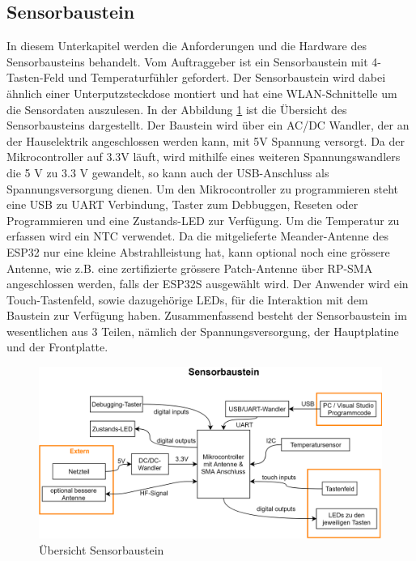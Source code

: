 \subsection{Sensorbaustein}\label{subsec: Sensorbaustein}
\label{sec: Sensorbaustein}
In diesem Unterkapitel werden die Anforderungen und die Hardware des Sensorbausteins behandelt.
Vom Auftraggeber ist ein Sensorbaustein mit 4-Tasten-Feld und Temperaturfühler gefordert. Der Sensorbaustein wird dabei ähnlich einer Unterputzsteckdose montiert und hat eine WLAN-Schnittelle um die Sensordaten auszulesen. In der Abbildung \ref{pic: Uebersicht_Sensorbaustein} ist die Übersicht des Sensorbausteins dargestellt. Der Baustein wird über ein AC/DC Wandler, der an der Hauselektrik angeschlossen werden kann, mit 5V Spannung versorgt. Da der Mikrocontroller auf 3.3V läuft, wird mithilfe eines weiteren Spannungswandlers die 5 V zu 3.3 V gewandelt, so kann auch der USB-Anschluss als Spannungsversorgung dienen. Um den Mikrocontroller zu programmieren steht eine USB zu UART Verbindung, Taster zum Debbuggen, Reseten oder Programmieren und eine Zustands-LED zur Verfügung. Um die Temperatur zu erfassen wird ein NTC verwendet. Da die mitgelieferte Meander-Antenne des ESP32 nur eine kleine Abstrahlleistung hat, kann optional noch eine grössere Antenne, wie z.B. eine zertifizierte grössere Patch-Antenne über RP-SMA angeschlossen werden, falls der ESP32S ausgewählt wird. Der Anwender wird ein Touch-Tastenfeld, sowie dazugehörige LEDs, für die Interaktion mit dem Baustein zur Verfügung haben. Zusammenfassend besteht der Sensorbaustein im wesentlichen aus 3 Teilen, nämlich der Spannungsversorgung, der Hauptplatine und der Frontplatte.

\begin{figure}[H]
	\centering
	\includegraphics[width=\textwidth]{graphics/Sensorbaustein.png}
	\caption{Übersicht Sensorbaustein}
	\label{pic: Uebersicht_Sensorbaustein}
\end{figure} 

